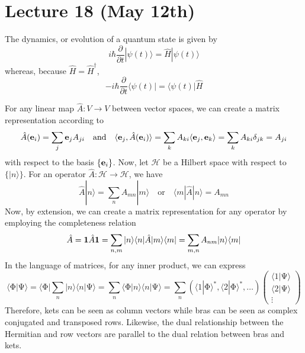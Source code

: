 \section{Lecture 18 (May 12th)}
\begin{prop}
The dynamics, or evolution of a quantum state is given by
\[i\hbar \dfrac{\partial }{\partial t}|\psi (t)\rangle =\hat{H}|\psi (t)\rangle  \]
whereas, because $\hat{H}=\hat{H}^{\dagger}$,
\[-i\hbar \dfrac{\partial }{\partial t}\langle \psi (t)|=\langle \psi (t)|\hat{H} \]
\end{prop}
\vspace{2ex}
\begin{defi}
For any linear map $\hat{A}:V\rightarrow V$ between vector spaces, we can create a matrix representation according to
\[\hat{A}({\bf e}_{i})=\sum _{j}{\bf e}_{j}A_{ji}\quad\mathrm{and}\quad \langle {\bf e}_{j},\hat{A}({\bf e}_{i})\rangle =\sum _{k}A_{ki}\langle {\bf e}_{j},{\bf e}_{k}\rangle =\sum _{k}A_{ki}\delta _{jk}=A_{ji}\]
with respect to the basis $\{{\bf e}_{i}\}$. Now, let $\mathcal{H}$ be a Hilbert space with respect to $\{|n\rangle \}$. For an operator $\hat{A}:\mathcal{H}\rightarrow \mathcal{H}$, we have
\[\hat{A}|n\rangle =\sum _{n}A_{mn}|m\rangle \quad\mathrm{or}\quad \langle m|\hat{A}|n\rangle =A_{mn}\]
Now, by extension, we can create a matrix representation for any operator by employing the completeness relation
\[\hat{A}={\bf 1}\hat{A}{\bf 1}=\sum _{n,m}|n\rangle \langle n|\hat{A}|m\rangle \langle m|=\sum _{m,n}A_{nm}|n\rangle \langle m|\]
In the language of matrices, for any inner product, we can express
\[\langle \mathrm{\Phi} |\mathrm{\Psi} \rangle =\langle \mathrm{\Phi} |\sum _{n}|n\rangle \langle n|\mathrm{\Psi} \rangle =\sum _{n}\langle \mathrm{\Phi} |n\rangle \langle n|\mathrm{\Psi} \rangle =\sum _{n}(\langle 1|\mathrm{\Phi} \rangle^{*} ,\langle 2|\mathrm{\Phi} \rangle^{*} ,\ldots)
\begin{pmatrix}
\langle 1|\mathrm{\Psi} \rangle \\
\langle 2|\mathrm{\Psi} \rangle \\
\vdots
\end{pmatrix}\]
Therefore, kets can be seen as column vectors while bras can be seen as complex conjugated and transposed rows. Likewise, the dual relationship between the Hermitian and row vectors are parallel to the dual relation between bras and kets. 
\end{defi}
\vspace{2ex}
